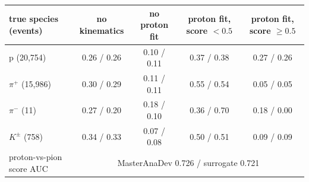 \begin{tabular}{lcccc}
\toprule
true species (events) & no kinematics & no proton fit & proton fit, score $<0.5$ & proton fit, score $\geq 0.5$ \\
\midrule
p (20,754) & 0.26 / 0.26 & 0.10 / 0.11 & 0.37 / 0.38 & 0.27 / 0.26 \\
$\pi^+$ (15,986) & 0.30 / 0.29 & 0.11 / 0.11 & 0.55 / 0.54 & 0.05 / 0.05 \\
$\pi^-$ (11) & 0.27 / 0.20 & 0.18 / 0.10 & 0.36 / 0.70 & 0.18 / 0.00 \\
$K^\pm$ (758) & 0.34 / 0.33 & 0.07 / 0.08 & 0.50 / 0.51 & 0.09 / 0.09 \\
\midrule
proton-vs-pion score AUC & \multicolumn{4}{c}{MasterAnaDev 0.726 / surrogate 0.721} \\
\bottomrule
\end{tabular}
